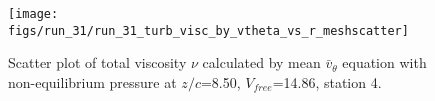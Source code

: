 \begin{figure}[H]
\centering
\texttt{[image: figs/run\_31/run\_31\_turb\_visc\_by\_vtheta\_vs\_r\_meshscatter]}
\caption{Scatter plot of total viscosity $\nu$ calculated by mean $\bar{v}_{\theta}$ equation with non-equilibrium pressure at $z/c$=8.50, $V_{free}$=14.86, station 4.}
\label{fig:run_31_turb_visc_by_vtheta_vs_r_meshscatter}
\end{figure}


